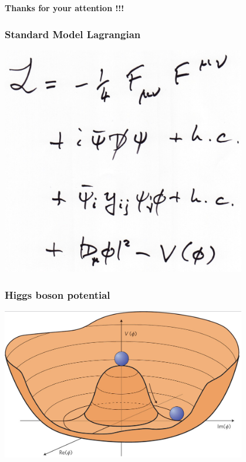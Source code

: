 \documentclass{beamer}
\begin{document}
\begin{frame}
  \begin{center}
    \huge
    \textbf{Thanks for your attention !!!}
  \end{center}
\end{frame}

  \appendix
  \setcounter{lastframe}{\insertframenumber}


  \begin{frame}[plain]
    \frametitle{Standard Model Lagrangian}

    \begin{center}
      \includegraphics[width = 0.8\textwidth]{Pictures/SM_lagrangian.png}
    \end{center}
  \end{frame}

  
  \begin{frame}[plain]
    \frametitle{Higgs boson potential}

    \begin{center}
      \includegraphics[width = 0.8\textwidth]{Pictures/higgsPotential.png}
    \end{center}
  \end{frame}
\end{document}
